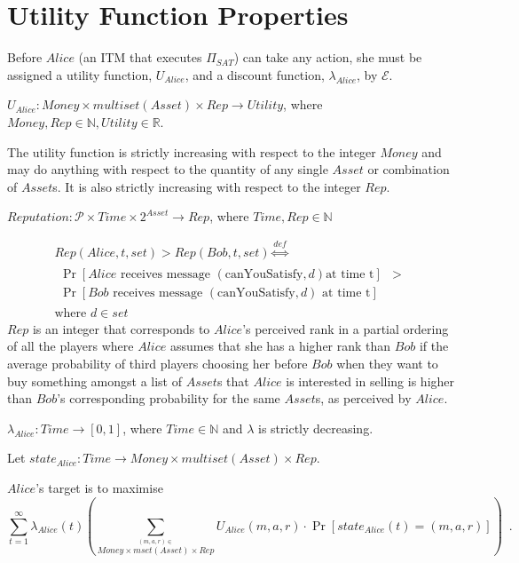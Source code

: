 \section{Utility Function Properties}
  Before $Alice$ (an ITM that executes $\Pi_{SAT}$) can take any action, she must be
  assigned a utility function, $U_{Alice}$, and a discount function, $\lambda_{Alice}$, by
  $\mathcal{E}$.
  \begin{definition}
    $U_{Alice} : Money \times multiset\left(Asset\right) \times Rep \rightarrow
    Utility$, where $Money, Rep \in \mathbb{N}, Utility \in \mathbb{R}$.
  \end{definition}
  The utility function is strictly increasing with respect to the integer $Money$ and may
  do anything with respect to the quantity of any single $Asset$ or combination of
  $Asset$s. It is also strictly increasing with respect to the integer $Rep$.

  \begin{definition}
    $Reputation : \mathcal{P} \times Time \times 2^{Asset} \rightarrow Rep$, where $Time,
    Rep \in \mathbb{N}$
  \end{definition}
  \begin{gather*}
    Rep\left(Alice, t, set\right) > Rep\left(Bob, t, set\right) \overset{def}{\iff} \\
    \begin{aligned}
      \Pr\left[Alice \mbox{ receives message } \left(\mbox{canYouSatisfy}, d\right) \mbox{
      at time t}\right] &> \\
      \Pr\left[Bob \mbox{ receives message } \left(\mbox{canYouSatisfy}, d\right) \mbox{ at
      time t}\right] &
    \end{aligned} \\
    \mbox{where } d \in set
  \end{gather*}
  $Rep$ is an integer that corresponds to $Alice$'s perceived rank in a partial ordering
  of all the players where $Alice$ assumes that she has a higher rank than $Bob$ if the
  average probability of third players choosing her before $Bob$ when they want to buy
  something amongst a list of $Asset$s that $Alice$ is interested in selling is higher
  than $Bob$'s corresponding probability for the same $Asset$s, as perceived by $Alice$.

  \begin{definition}
    $\lambda_{Alice} : Time \rightarrow \left[0, 1\right]$, where $Time \in \mathbb{N}$
    and $\lambda$ is strictly decreasing.
  \end{definition}
  \begin{definition}[State]
  Let $state_{Alice} : Time \rightarrow Money \times multiset\left(Asset\right) \times
  Rep$.
  \end{definition}
  $Alice$'s target is to maximise
  \begin{equation*}
    \sum\limits_{t = 1}^{\infty}
    \lambda_{Alice}\left(t\right)\left(\sum\limits_{\overset{\left(m, a, r\right)
    \in}{Money \times mset\left(Asset\right) \times Rep}} U_{Alice}\left(m, a,
    r\right) \cdot \Pr\left[state_{Alice}\left(t\right) = \left(m, a,
    r\right)\right]\right) \enspace.
  \end{equation*}

